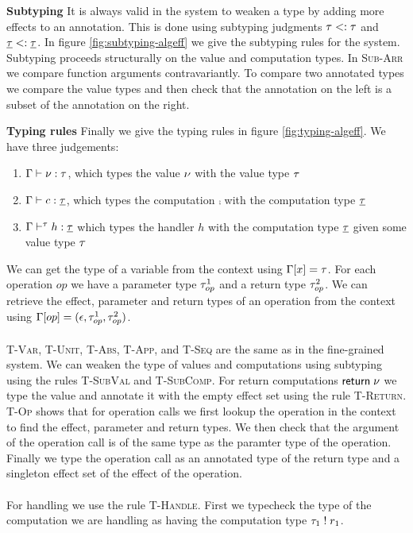 {\textbf{Subtyping}
It is always valid in the system to weaken a type by adding more effects to an annotation.
This is done using subtyping judgments $\tau <: \tau$ and $\underline{\tau} <: \underline{\tau}$.
In figure \ref{fig:subtyping-algeff} we give the subtyping rules for the system.
Subtyping proceeds structurally on the value and computation types.
In \textsc{Sub-Arr} we compare function arguments contravariantly.
To compare two annotated types we compare the value types and then check that the annotation on the left is a subset of the annotation on the right.

\textbf{Typing rules}
Finally we give the typing rules in figure \ref{fig:typing-algeff}.
We have three judgements:
\begin{enumerate}
\item $\Gamma \vdash \nu : \tau$, which types the value $\nu$ with the value type $\tau$
\item $\Gamma \vdash c : \underline{\tau}$, which types the computation $\comp$ with the computation type $\underline{\tau}$
\item $\Gamma \vdash^{\tau} h : \underline{\tau}$ which types the handler $h$ with the computation type $\underline{\tau}$ given some value type $\tau$
\end{enumerate}
We can get the type of a variable from the context using $\Gamma[x] = \tau$.
For each operation $op$ we have a parameter type $\tau^1_{op}$ and a return type $\tau^2_{op}$.
We can retrieve the effect, parameter and return types of an operation from the context using $\Gamma[op] = (\epsilon, \tau^1_{op}, \tau^2_{op})$.
\\\\
\textsc{T-Var}, \textsc{T-Unit}, \textsc{T-Abs}, \textsc{T-App}, and \textsc{T-Seq} are the same as in the fine-grained system.
We can weaken the type of values and computations using subtyping using the rules \textsc{T-SubVal} and \textsc{T-SubComp}.
For return computations $\mathsf{return} \; \nu$ we type the value and annotate it with the empty effect set using the rule \textsc{T-Return}.
\textsc{T-Op} shows that for operation calls we first lookup the operation in the context to find the effect, parameter and return types.
We then check that the argument of the operation call is of the same type as the paramter type of the operation.
Finally we type the operation call as an annotated type of the return type and a singleton effect set of the effect of the operation.
\\\\
For handling we use the rule \textsc{T-Handle}.
First we typecheck the type of the computation we are handling as having the computation type $\tau_1 \; ! \; r_1$.
}
